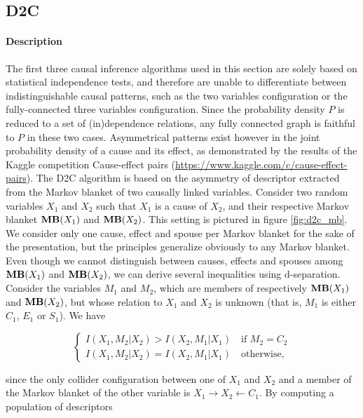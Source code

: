 \subsection{D2C}

\paragraph{Description} The first three causal inference algorithms used in this
section are solely based on statistical independence tests, and therefore are
unable to differentiate between indistinguishable causal patterns, such as the
two variables configuration or the fully-connected three variables
configuration. Since the probability density $P$ is reduced to a set of
(in)dependence relations, any fully connected graph is faithful to $P$ in these
two cases. Asymmetrical patterns exist however in the joint probability density
of a cause and its effect, as demonstrated by the results of the Kaggle
competition Cause-effect pairs
(\url{https://www.kaggle.com/c/cause-effect-pairs}). The D2C algorithm
\parencite{bontempi2015dependency} is based on the asymmetry of descriptor
extracted from the Markov blanket of two causally linked variables. Consider two
random variables $X_1$ and $X_2$ such that $X_1$ is a cause of $X_2$, and their
respective Markov blanket $\textbf{MB}(X_1)$ and $\textbf{MB}(X_2)$. This setting is pictured in
figure \ref{fig:d2c_mb}. We consider only one cause, effect and spouse per
Markov blanket for the sake of the presentation, but the principles generalize
obviously to any Markov blanket. Even though we cannot distinguish between
causes, effects and spouses among $\textbf{MB}(X_1)$ and $\textbf{MB}(X_2)$, we can derive
several inequalities using d-separation. Consider the variables $M_1$ and $M_2$,
which are members of respectively  $\textbf{MB}(X_1)$ and $\textbf{MB}(X_2)$, but whose relation
to $X_1$ and $X_2$ is unknown (that is, $M_1$ is either $C_1$, $E_1$ or $S_1$).
We have

\begin{equation}
\label{eq:d2c_ineq}
\begin{cases}
    I(X_1, M_2 | X_2) > I(X_2, M_1 | X_1)\quad\text{if }M_2 = C_2 \\
    I(X_1, M_2 | X_2) = I(X_2, M_1 | X_1)\quad\text{otherwise,}
\end{cases}
\end{equation}

since the only collider configuration between one of $X_1$ and $X_2$ and a
member of the Markov blanket of the other variable is $X_1\rightarrow
X_2\leftarrow C_1$. By computing a population of descriptors

